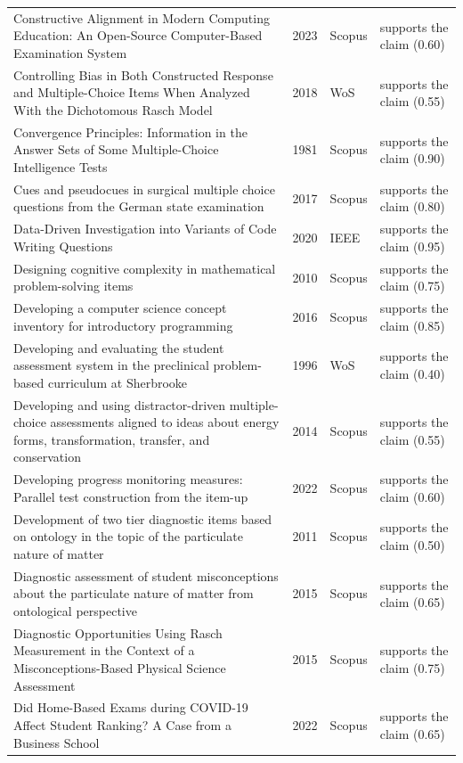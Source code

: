 \begin{longtable}{@{}%
  >{\raggedright\arraybackslash}p{}c%
  >{\raggedright\arraybackslash}p{}%
  >{\raggedright\arraybackslash}p{}@{}}
Constructive Alignment in Modern Computing Education: An Open-Source Computer-Based Examination System & 2023 & Scopus & supports the claim (0.60) \\
Controlling Bias in Both Constructed Response and Multiple-Choice Items When Analyzed With the Dichotomous Rasch Model & 2018 & WoS & supports the claim (0.55) \\
Convergence Principles: Information in the Answer Sets of Some Multiple-Choice Intelligence Tests & 1981 & Scopus & supports the claim (0.90) \\
Cues and pseudocues in surgical multiple choice questions from the German state examination & 2017 & Scopus & supports the claim (0.80) \\
Data-Driven Investigation into Variants of Code Writing Questions & 2020 & IEEE & supports the claim (0.95) \\
Designing cognitive complexity in mathematical problem-solving items & 2010 & Scopus & supports the claim (0.75) \\
Developing a computer science concept inventory for introductory programming & 2016 & Scopus & supports the claim (0.85) \\
Developing and evaluating the student assessment system in the preclinical problem-based curriculum at Sherbrooke & 1996 & WoS & supports the claim (0.40) \\
Developing and using distractor-driven multiple-choice assessments aligned to ideas about energy forms, transformation, transfer, and conservation & 2014 & Scopus & supports the claim (0.55) \\
Developing progress monitoring measures: Parallel test construction from the item-up & 2022 & Scopus & supports the claim (0.60) \\
Development of two tier diagnostic items based on ontology in the topic of the particulate nature of matter & 2011 & Scopus & supports the claim (0.50) \\
Diagnostic assessment of student misconceptions about the particulate nature of matter from ontological perspective & 2015 & Scopus & supports the claim (0.65) \\
Diagnostic Opportunities Using Rasch Measurement in the Context of a Misconceptions-Based Physical Science Assessment & 2015 & Scopus & supports the claim (0.75) \\
Did Home-Based Exams during COVID-19 Affect Student Ranking? A Case from a Business School & 2022 & Scopus & supports the claim (0.65) \\

\end{longtable}
